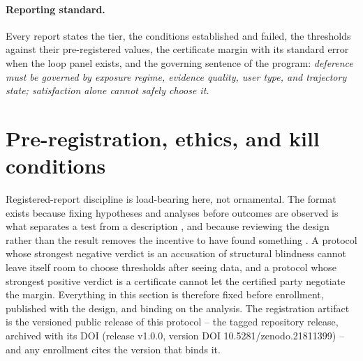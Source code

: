 \documentclass[11pt]{article}
\theoremstyle{definition}
\theoremstyle{remark}
\numberwithin{equation}{section}
\begin{document}
\paragraph{Reporting standard.} Every report states the tier, the conditions established and failed, the thresholds against their pre-registered values, the certificate margin with its standard error when the loop panel exists, and the governing sentence of the program: \emph{deference must be governed by exposure regime, evidence quality, user type, and trajectory state; satisfaction alone cannot safely choose it.}

\section{Pre-registration, ethics, and kill conditions}\label{sec:prereg}

Registered-report discipline is load-bearing here, not ornamental. The format exists because fixing hypotheses and analyses before outcomes are observed is what separates a test from a description \citep{nosek2018preregistration}, and because reviewing the design rather than the result removes the incentive to have found something \citep{chambers2022past}. A protocol whose strongest negative verdict is an accusation of structural blindness cannot leave itself room to choose thresholds after seeing data, and a protocol whose strongest positive verdict is a certificate cannot let the certified party negotiate the margin. Everything in this section is therefore fixed before enrollment, published with the design, and binding on the analysis. The registration artifact is the versioned public release of this protocol -- the tagged repository release, archived with its DOI (release v1.0.0, version DOI 10.5281/zenodo.21811399) -- and any enrollment cites the version that binds it.
\end{document}
